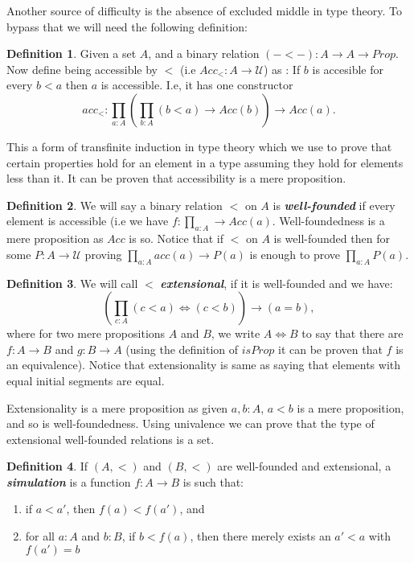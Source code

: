 \documentclass[10pt]{article}
\theoremstyle{definition}
\newtheorem{definition}{Definition}[section]
\theoremstyle{plain}
\theoremstyle{remark}
\newcommand{\U}{\mathscr{U}}
\begin{document}
Another source of difficulty is the absence of excluded middle in type theory. To bypass that
we will need the following definition:

\begin{definition}\label{D:Acc}
Given a set $A$, and a binary relation $(-<-) : A \to A \to Prop$. Now define being 
accessible by $<$ (i.e ${Acc}_{<} : A \to \U$) as : If $b$ is accesible for every $b<a$ 
then $a$ is accessible. I.e, it has one constructor 
\[ {acc}_< : \prod_{a : A} \left( \prod_{b : A} (b<a) \to {Acc}(b) \right) 
\to {Acc}(a). \]

\end{definition}
 
This a form of transfinite induction in type theory which we use to prove that certain
properties hold for an element in a type assuming they hold for elements less than it.
It can be proven that accessibility is a mere proposition. 

\begin{definition}\label{D:WF}
We will say a binary relation $<$ on $A$ is \textbf{\textit{well-founded}} if every element
is accessible (i.e we have $f : \prod_{a : A} \to Acc(a)$. Well-foundedness is a mere 
proposition as ${Acc}$ is so. Notice that if $<$ on $A$ is well-founded then for some 
$P : A \to \U$ proving $\prod_{a:A} acc(a) \to P(a)$ is enough to prove $\prod_{a : A} P(a)$.
\end{definition}

\begin{definition}\label{D:Ext}
We will call $<$ \textbf{\textit{extensional}}, if it is well-founded and we have:
\[ \left( \prod_{c : A}  (c<a) \iff (c<b) \right) \to (a = b),\]
where for two mere propositions $A$ and $B$, we write $A\iff B$ to say that there are 
$f : A \to B$ and $g : B \to A$ (using the definition of ${isProp}$ it can be proven 
that $f$ is an equivalence). Notice that extensionality is same as saying that elements 
with equal initial segments are equal.
\end{definition} 

Extensionality is a mere proposition as given $a,b:A$, $a<b$ is a mere proposition, and so
is well-foundedness. Using univalence we can prove that the type of extensional well-founded
relations is a set.

\begin{definition}\label{D:sim}
If $(A,<)$ and $(B,<)$ are well-founded and extensional, a \textbf{\textit{simulation}} is
a function $f : A \to B$ is such that:
\begin{enumerate}
\item if $a < a'$, then $f(a) < f(a')$, and
\item for all $a : A$ and $b : B$, if $b < f(a)$, then there merely exists an $a' < a$ with
      $f(a') = b$
\end{enumerate}
\end{definition} 
\end{document}
